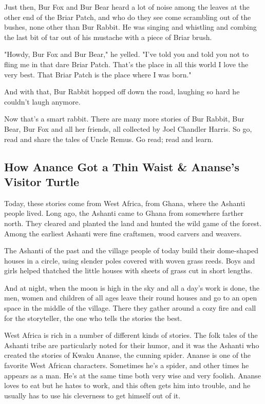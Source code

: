 Just then, Bur Fox and Bur Bear heard a lot of noise among the leaves at the other end of the Briar Patch, and who do they see come scrambling out of the bushes, none other than Bur Rabbit. He was singing and whistling and combing the last bit of tar out of his mustache with a piece of Briar brush.

"Howdy, Bur Fox and Bur Bear," he yelled. "I've told you and told you not to fling me in that dare Briar Patch. That's the place in all this world I love the very best. That Briar Patch is the place where I was born."

And with that, Bur Rabbit hopped off down the road, laughing so hard he couldn't laugh anymore.

Now that's a smart rabbit. There are many more stories of Bur Rabbit, Bur Bear, Bur Fox and all her friends, all collected by Joel Chandler Harris. So go, read and share the tales of Uncle Remus. Go read; read and learn.

\subsection{How Anance Got a Thin Waist \& Ananse's Visitor Turtle}

Today, these stories come from West Africa, from Ghana, where the Ashanti people lived. Long ago, the Ashanti came to Ghana from somewhere farther north. They cleared and planted the land and hunted the wild game of the forest. Among the earliest Ashanti were fine craftsmen, wood carvers and weavers.

The Ashanti of the past and the village people of today build their dome-shaped houses in a circle, using slender poles covered with woven grass reeds. Boys and girls helped thatched the little houses with sheets of grass cut in short lengths.

And at night, when the moon is high in the sky and all a day's work is done, the men, women and children of all ages leave their round houses and go to an open space in the middle of the village. There they gather around a cozy fire and call for the storyteller, the one who tells the stories the best.

West Africa is rich in a number of different kinds of stories. The folk tales of the Ashanti tribe are particularly noted for their humor, and it was the Ashanti who created the stories of Kwaku Ananse, the cunning spider. Ananse is one of the favorite West African characters. Sometimes he's a spider, and other times he appears as a man. He's at the same time both very wise and very foolish. Ananse loves to eat but he hates to work, and this often gets him into trouble, and he usually has to use his cleverness to get himself out of it.

